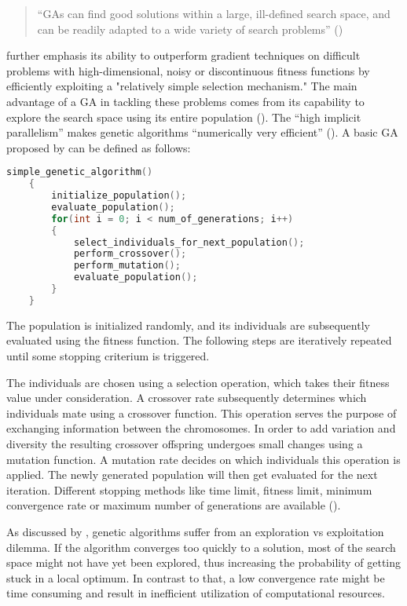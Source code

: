 \begin{quote}
	\begin{em}
		\enquote{GAs can find good solutions within a large, ill-defined search space, and can be readily adapted to a wide variety of search problems} (\cite{mills_determining_2015})
	\end{em}
\end{quote}

\cite{grefenstette_optimization_1986} further emphasis its ability to outperform gradient techniques on difficult problems with high-dimensional, noisy or discontinuous fitness functions by efficiently exploiting a "relatively simple selection mechanism." The main advantage of a GA in tackling these problems comes from its capability to explore the search space using its entire population (\cite{hussain_trade-off_2020}). The \enquote{high implicit parallelism} makes genetic algorithms \enquote{numerically very efficient} (\cite{marsili_libelli_adaptive_2000}). A basic GA proposed by \cite{holland_adaptation_1992} can be defined as follows:

\begin{lstlisting}[language=C, tabsize=4]
	simple_genetic_algorithm() 
	{
		initialize_population();
		evaluate_population();
		for(int i = 0; i < num_of_generations; i++) 
		{
			select_individuals_for_next_population();
			perform_crossover();
			perform_mutation();
			evaluate_population();
		}
	}
\end{lstlisting}

The population is initialized randomly, and its individuals are subsequently evaluated using the fitness function. The following steps are iteratively repeated until some stopping criterium is triggered. 

The individuals are chosen using a selection operation, which takes their fitness value under consideration. A crossover rate subsequently determines which individuals mate using a crossover function. This operation serves the purpose of exchanging information between the chromosomes. In order to add variation and diversity the resulting crossover offspring undergoes small changes using a mutation function. A mutation rate decides on which individuals this operation is applied. The newly generated population will then get evaluated for the next iteration. Different stopping methods like time limit, fitness limit, minimum convergence rate or maximum number of generations are available (\cite{majumdar_genetic_2015}).

As discussed by \cite{hussain_trade-off_2020}, genetic algorithms suffer from an exploration vs exploitation dilemma. If the algorithm converges too quickly to a solution, most of the search space might not have yet been explored, thus increasing the probability of getting stuck in a local optimum.
In contrast to that, a low convergence rate might be time consuming and result in inefficient utilization of computational resources.

